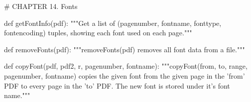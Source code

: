 # CHAPTER 14. Fonts

def getFontInfo(pdf):
    """Get a list of (pagenumber, fontname, fonttype, fontencoding) tuples,
    showing each font used on each page."""

def removeFonts(pdf):
    """removeFonts(pdf) removes all font data from a file."""

def copyFont(pdf, pdf2, r, pagenumber, fontname):
    """copyFont(from, to, range, pagenumber, fontname) copies the given font
    from the given page in the 'from' PDF to every page in the 'to' PDF. The
    new font is stored under it's font name."""
